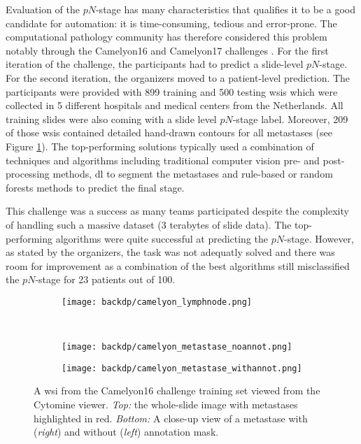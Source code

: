 Evaluation of the $pN$-stage has many characteristics that qualifies it to be a good candidate for automation: it is time-consuming, tedious and error-prone. The computational pathology community has therefore considered this problem notably through the Camelyon16 and Camelyon17 challenges \cite{litjens2018camelyon}. For the first iteration of the challenge, the participants had to predict a slide-level $pN$-stage. For the second iteration, the organizers moved to a patient-level prediction. The participants were provided with 899 training and 500 testing \acrshort{wsi}s which were collected in 5 different hospitals and medical centers from the Netherlands. All training slides were also coming with a slide level $pN$-stage label. Moreover, 209 of those \acrshort{wsi}s contained detailed hand-drawn contours for all metastases (see Figure \ref{fig:backdp:camelyon_sample}). The top-performing solutions typically used a combination of techniques and algorithms including traditional computer vision pre- and post-processing methods, \acrlong{dl} to segment the metastases and rule-based or random forests methods to predict the final stage. 

This challenge was a success as many teams participated despite the complexity of handling such a massive dataset (3 terabytes of slide data). The top-performing algorithms were quite successful at predicting the $pN$-stage. However, as stated by the organizers, the task was not adequatly solved and there was room for improvement \cite{bandi2018detection} as a combination of the best algorithms still misclassified the $pN$-stage for 23 patients out of 100. 

\begin{figure}
  \centering
  \begin{subfigure}[t]{\textwidth}
    \centering
    \texttt{[image: backdp/camelyon\_lymphnode.png]} 
  \end{subfigure}\\
  \vspace{1cm}
  \begin{subfigure}[t]{0.48\textwidth}
    \centering
    \texttt{[image: backdp/camelyon\_metastase\_noannot.png]}
  \end{subfigure}
  \begin{subfigure}[t]{0.48\textwidth}
    \centering
    \texttt{[image: backdp/camelyon\_metastase\_withannot.png]}
  \end{subfigure}
  \caption{A \acrshort{wsi} from the Camelyon16 challenge training set viewed from the Cytomine viewer. \textit{Top:} the whole-slide image with metastases highlighted in red. \textit{Bottom:} A close-up view of a metastase with (\textit{right}) and without (\textit{left}) annotation mask.}
  \label{fig:backdp:camelyon_sample}
\end{figure}

